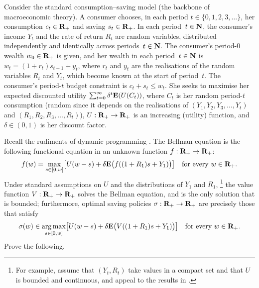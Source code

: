 \begin{exercise}
	\label{exercise:consumption-saving}
	Consider the standard consumption--saving model (the backbone of macroeconomic theory). A consumer chooses, in each period $t \in \{0,1,2,3,\dots\}$, her consumption $c_t \in \mathbf{R}_+$ and saving $s_t \in \mathbf{R}_+$. In each period~$t \in \mathbf{N}$, the consumer's income $Y_t$ and the rate of return $R_t$ are random variables, distributed independently and identically across periods~$t \in \mathbf{N}$. The consumer's period-$0$ wealth $w_0 \in \mathbf{R}_+$ is given, and her wealth in each period~$t \in \mathbf{N}$ is $w_t = (1+r_t) s_{t-1} + y_t$, where $r_t$ and $y_t$ are the realisations of the random variables $R_t$ and $Y_t$, which become known at the start of period~$t$. The consumer's period-$t$ budget constraint is $c_t + s_t \leq w_t$. She seeks to maximise her expected discounted utility $\sum_{t=0}^\infty \delta^t \mathbf{E}(U(C_t))$, where $C_t$ is her random period-$t$ consumption (random since it depends on the realisations of $(Y_1,Y_2,Y_3,\dots,Y_t)$ and $(R_1,R_2,R_3,\dots,R_t)$), $U : \mathbf{R}_+ \to \mathbf{R}_+$ is an increasing (utility) function, and $\delta \in (0,1)$ is her discount factor.

	Recall the rudiments of dynamic programming \parencite[e.g.][]{StokeyLucasPrescott1989}. The Bellman equation is the following functional equation in an unknown function $f : \mathbf{R}_+ \to \mathbf{R}_+$:
	\begin{equation*}
		f(w) =
		\max_{s \in [0,w]}
		\left[ U(w-s) + \delta \E\bigl( f\left( (1+R_1) s + Y_1 \right) \bigr) \right]
		\quad \text{for every $w \in \R_+$.}
	\end{equation*}
	Under standard assumptions on $U$ and the distributions of $Y_1$ and $R_1$,%
		\footnote{For example, assume that $(Y_t,R_t)$ take values in a compact set and that $U$ is bounded and continuous, and appeal to the results in \textcite[][chapter~9]{StokeyLucasPrescott1989}.}
	the value function $V : \mathbf{R}_+ \to \mathbf{R}_+$ solves the Bellman equation, and is the only solution that is bounded; furthermore, optimal saving policies $\sigma : \mathbf{R}_+ \to \mathbf{R}_+$ are precisely those that satisfy
	\begin{equation*}
		\sigma(w) \in \argmax_{s \in [0,w]}
		\left[ U(w-s) + \delta \E\bigl( V\left( (1+R_1) s + Y_1 \right) \bigr) \right] 
		\quad \text{for every $w \in \R_+$.}
	\end{equation*}
	Prove the following.

	\begin{enumerate}[label=(\alph*)]
	

\end{enumerate}
\end{exercise}
